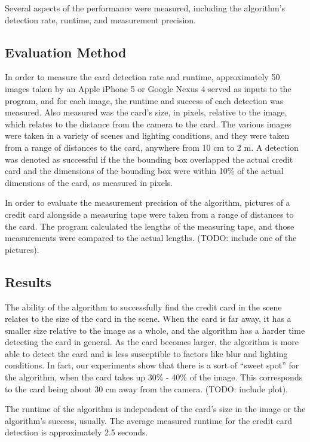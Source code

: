 \documentclass[10pt,twocolumn,letterpaper]{article}
\begin{document}
Several aspects of the performance were measured, including the algorithm’s detection rate, runtime, and measurement precision.

\subsection{Evaluation Method}

	In order to measure the card detection rate and runtime, approximately 50 images taken by an Apple iPhone 5 or Google Nexus 4 served as inputs to the program, and for each image, the runtime and success of each detection was measured. Also measured was the card’s size, in pixels, relative to the image, which relates to the distance from the camera to the card. The various images were taken in a variety of scenes and lighting conditions, and they were taken from a range of distances to the card, anywhere from 10 cm to 2 m. A detection was denoted as successful if the the bounding box overlapped the actual credit card and the dimensions of the bounding box were within 10\% of the actual dimensions of the card, as measured in pixels. 

	In order to evaluate the measurement precision of the algorithm, pictures of a credit card alongside a measuring tape were taken from a range of distances to the card. The program calculated the lengths of the measuring tape, and those measurements were compared to the actual lengths. (TODO: include one of the pictures).
\subsection{Results}

	The ability of the algorithm to successfully find the credit card in the scene relates to the size of the card in the scene. When the card is far away, it has a smaller size relative to the image as a whole, and the algorithm has a harder time detecting the card in general. As the card becomes larger, the algorithm is more able to detect the card and is less susceptible to factors like blur and lighting conditions. In fact, our experiments show that there is a sort of 
“sweet spot” for the algorithm, when the card takes up 30\% - 40\% of the image. This corresponds to the card being about 30 cm away from the camera. (TODO: include plot).

	The runtime of the algorithm is independent of the card’s size in the image or the algorithm’s success, usually. The average measured runtime for the credit card detection is approximately 2.5 seconds. 
\end{document}
